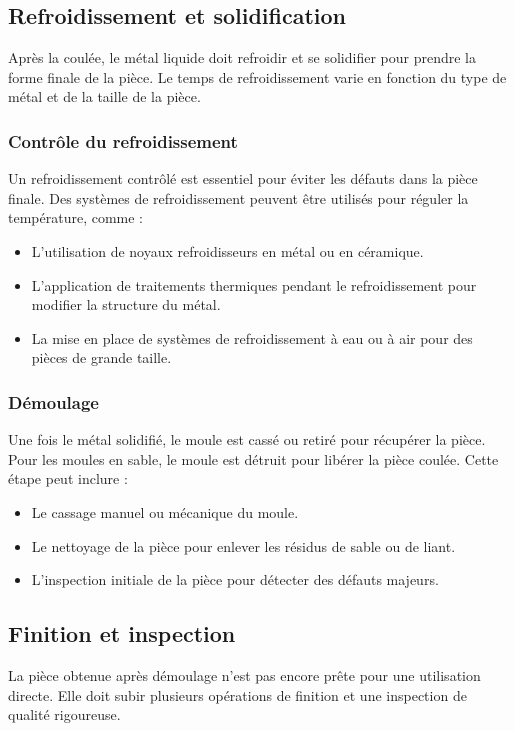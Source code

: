 \documentclass[12pt]{article}
\begin{document}
\subsection{Refroidissement et solidification}
Après la coulée, le métal liquide doit refroidir et se solidifier pour prendre la forme finale de la pièce. Le temps de refroidissement varie en fonction du type de métal et de la taille de la pièce.

\subsubsection{Contrôle du refroidissement}
Un refroidissement contrôlé est essentiel pour éviter les défauts dans la pièce finale. Des systèmes de refroidissement peuvent être utilisés pour réguler la température, comme :

\begin{itemize}
    \item L'utilisation de noyaux refroidisseurs en métal ou en céramique.
    \item L'application de traitements thermiques pendant le refroidissement pour modifier la structure du métal.
    \item La mise en place de systèmes de refroidissement à eau ou à air pour des pièces de grande taille.
\end{itemize}

\subsubsection{Démoulage}
Une fois le métal solidifié, le moule est cassé ou retiré pour récupérer la pièce. Pour les moules en sable, le moule est détruit pour libérer la pièce coulée. Cette étape peut inclure :

\begin{itemize}
    \item Le cassage manuel ou mécanique du moule.
    \item Le nettoyage de la pièce pour enlever les résidus de sable ou de liant.
    \item L'inspection initiale de la pièce pour détecter des défauts majeurs.
\end{itemize}

\subsection{Finition et inspection}
La pièce obtenue après démoulage n'est pas encore prête pour une utilisation directe. Elle doit subir plusieurs opérations de finition et une inspection de qualité rigoureuse.
\end{document}
